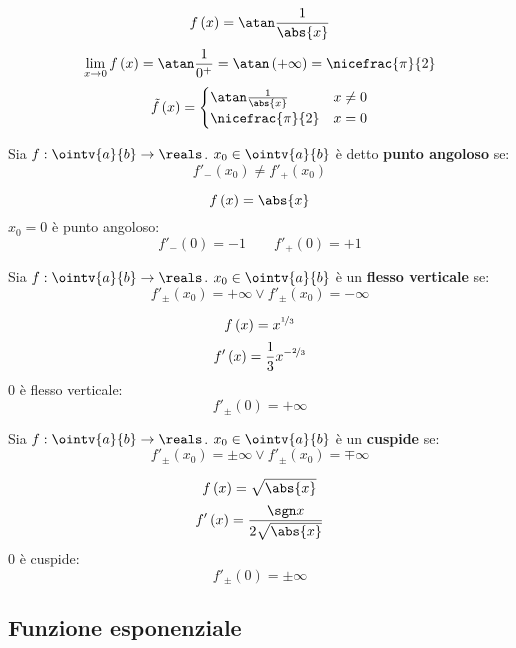 \begin{example}
  $$f\left( x \right)=\atan\frac{1}{\abs{x}}$$
  $$\lim_{x\to0}f\left( x \right)=\atan\frac{1}{0^+}=\atan\left( +\infty \right)=\nicefrac{\pi}{2}$$
  $$
    \tilde{f}\left( x \right)=
    \begin{cases}
      \atan\frac{1}{\abs{x}} & x\neq0 \\
      \nicefrac{\pi}{2}      & x=0    \\
    \end{cases}
  $$
\end{example}

\begin{definition}
  Sia $f:\ointv{a}{b}\to\reals$. $x_0\in\ointv{a}{b}$ è detto \textbf{punto angoloso} se:
  $$f'_-\left( x_0 \right)\neq f'_+\left( x_0 \right)$$
\end{definition}

\begin{example}
  $$f\left( x \right)=\abs{x}$$
  $x_0=0$ è punto angoloso:
  $$f'_-\left( 0 \right)=-1\qquad f'_+\left( 0 \right)=+1$$
\end{example}

\begin{definition}
  Sia $f:\ointv{a}{b}\to\reals$. $x_0\in\ointv{a}{b}$ è un \textbf{flesso verticale} se:
  $$f'_\pm\left( x_0 \right)=+\infty \vee f'_\pm\left( x_0 \right)=-\infty$$
\end{definition}

\begin{example}
  $$f\left( x \right)=x^{\nicefrac{1}{3}}$$
  $$f'\left( x \right)=\frac{1}{3}x^{-\nicefrac{2}{3}}$$
  $0$ è flesso verticale:
  $$f'_\pm\left( 0 \right)=+\infty$$
\end{example}

\begin{definition}[Cuspide]
  Sia $f:\ointv{a}{b}\to\reals$. $x_0\in\ointv{a}{b}$ è un \textbf{cuspide} se:
  $$f'_\pm\left( x_0 \right)=\pm\infty \vee f'_\pm\left( x_0 \right)=\mp\infty$$
\end{definition}

\begin{example}
  $$f\left( x \right)=\sqrt{\abs{x}}$$
  $$f'\left( x \right)=\frac{\sgn x}{2\sqrt{\abs{x}}}$$
  $0$ è cuspide:
  $$f'_\pm\left( 0 \right)=\pm\infty$$
\end{example}

\subsection{Funzione esponenziale}

